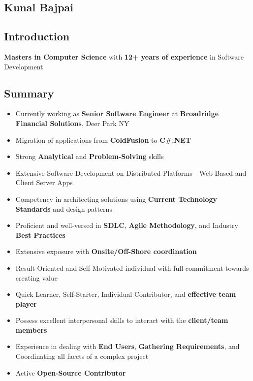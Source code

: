 \documentclass[letterpaper,11pt]{article}
\begin{document}
\begin{center}
\section{Kunal Bajpai}
\end{center}

\subsection{Introduction}
\textbf{Masters in Computer Science} with \textbf{12+ years of experience} in Software Development

\subsection{Summary}
\begin{itemize}
    \item Currently working as \textbf{Senior Software Engineer} at \textbf{Broadridge Financial Solutions}, Deer Park NY
    \item Migration of applications from \textbf{ColdFusion} to \textbf{C\#.NET}
    \item Strong \textbf{Analytical} and \textbf{Problem-Solving} skills
    \item Extensive Software Development on Distributed Platforms - Web Based and Client Server Apps
    \item Competency in architecting solutions using \textbf{Current Technology Standards} and design patterns
    \item Proficient and well-versed in \textbf{SDLC}, \textbf{Agile Methodology}, and Industry \textbf{Best Practices}
    \item Extensive exposure with \textbf{Onsite/Off-Shore coordination}
    \item Result Oriented and Self-Motivated individual with full commitment towards creating value
    \item Quick Learner, Self-Starter, Individual Contributor, and \textbf{effective team player}
    \item Possess excellent interpersonal skills to interact with the \textbf{client/team members}
    \item Experience in dealing with \textbf{End Users}, \textbf{Gathering Requirements}, and Coordinating all facets of a complex project
    \item Active \textbf{Open-Source Contributor}
\end{itemize}
\end{document}
